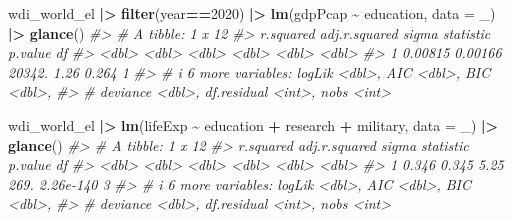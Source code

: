 \documentclass[
  xelatex, ja=standard]{bxjsbook}
\newenvironment{Shaded}{\begin{snugshade}}{\end{snugshade}}
\newcommand{\AttributeTok}[1]{\textcolor[rgb]{0.13,0.29,0.53}{#1}}
\newcommand{\CommentTok}[1]{\textcolor[rgb]{0.56,0.35,0.01}{\textit{#1}}}
\newcommand{\DecValTok}[1]{\textcolor[rgb]{0.00,0.00,0.81}{#1}}
\newcommand{\FunctionTok}[1]{\textcolor[rgb]{0.13,0.29,0.53}{\textbf{#1}}}
\newcommand{\NormalTok}[1]{#1}
\newcommand{\SpecialCharTok}[1]{\textcolor[rgb]{0.81,0.36,0.00}{\textbf{#1}}}
\theoremstyle{definition}
\theoremstyle{definition}
\theoremstyle{definition}
\theoremstyle{definition}
\theoremstyle{remark}
\begin{document}
\begin{Shaded}
\begin{Highlighting}[]
\NormalTok{wdi\_world\_el }\SpecialCharTok{|\textgreater{}} \FunctionTok{filter}\NormalTok{(year}\SpecialCharTok{==}\DecValTok{2020}\NormalTok{) }\SpecialCharTok{|\textgreater{}} \FunctionTok{lm}\NormalTok{(gdpPcap }\SpecialCharTok{\textasciitilde{}}\NormalTok{ education, }\AttributeTok{data =}\NormalTok{ \_) }\SpecialCharTok{|\textgreater{}} \FunctionTok{glance}\NormalTok{()}
\CommentTok{\#\textgreater{} \# A tibble: 1 x 12}
\CommentTok{\#\textgreater{}   r.squared adj.r.squared  sigma statistic p.value    df}
\CommentTok{\#\textgreater{}       \textless{}dbl\textgreater{}         \textless{}dbl\textgreater{}  \textless{}dbl\textgreater{}     \textless{}dbl\textgreater{}   \textless{}dbl\textgreater{} \textless{}dbl\textgreater{}}
\CommentTok{\#\textgreater{} 1   0.00815       0.00166 20342.      1.26   0.264     1}
\CommentTok{\#\textgreater{} \# i 6 more variables: logLik \textless{}dbl\textgreater{}, AIC \textless{}dbl\textgreater{}, BIC \textless{}dbl\textgreater{},}
\CommentTok{\#\textgreater{} \#   deviance \textless{}dbl\textgreater{}, df.residual \textless{}int\textgreater{}, nobs \textless{}int\textgreater{}}
\end{Highlighting}
\end{Shaded}

\begin{Shaded}
\begin{Highlighting}[]
\NormalTok{wdi\_world\_el }\SpecialCharTok{|\textgreater{}} \FunctionTok{lm}\NormalTok{(lifeExp }\SpecialCharTok{\textasciitilde{}}\NormalTok{ education }\SpecialCharTok{+}\NormalTok{ research }\SpecialCharTok{+}\NormalTok{ military, }\AttributeTok{data =}\NormalTok{ \_) }\SpecialCharTok{|\textgreater{}} \FunctionTok{glance}\NormalTok{()}
\CommentTok{\#\textgreater{} \# A tibble: 1 x 12}
\CommentTok{\#\textgreater{}   r.squared adj.r.squared sigma statistic   p.value    df}
\CommentTok{\#\textgreater{}       \textless{}dbl\textgreater{}         \textless{}dbl\textgreater{} \textless{}dbl\textgreater{}     \textless{}dbl\textgreater{}     \textless{}dbl\textgreater{} \textless{}dbl\textgreater{}}
\CommentTok{\#\textgreater{} 1     0.346         0.345  5.25      269. 2.26e{-}140     3}
\CommentTok{\#\textgreater{} \# i 6 more variables: logLik \textless{}dbl\textgreater{}, AIC \textless{}dbl\textgreater{}, BIC \textless{}dbl\textgreater{},}
\CommentTok{\#\textgreater{} \#   deviance \textless{}dbl\textgreater{}, df.residual \textless{}int\textgreater{}, nobs \textless{}int\textgreater{}}
\end{Highlighting}
\end{Shaded}
\end{document}
